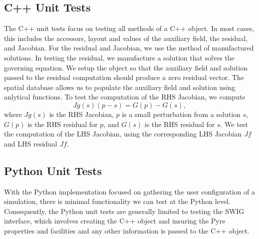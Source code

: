 
\subsection{C++ Unit Tests}

The C++ unit tests focus on testing all methods of a C++ object. In most cases, this includes the accessors, layout and
values of the auxiliary field, the residual, and Jacobian. For the residual and Jacobian, we use the method of
manufactured solutions. In testing the residual, we manufacture a solution that solves the governing equation. We setup
the object so that the auxiliary field and solution passed to the residual computation should produce a zero residual
vector. The  spatial database allows us to populate the auxiliary field and solution using
anlytical functions. To test the computation of the RHS Jacobian, we compute
\begin{equation}
    Jg(s) (p - s) = G(p) - G(s),
\end{equation}
where $Jg(s)$ is the RHS Jacobian, $p$ is a small perturbation from a solution $s$, $G(p)$ is the RHS residual for $p$,
and $G(s)$ is the RHS residual for $s$. We test the computation of the LHS Jacobian, using the corresponding LHS Jacobian $Jf$
and LHS residual $Jf$.




\subsection{Python Unit Tests}

With the Python implementation focused on gathering the user configuration of a simulation, there is
minimal functionality we can test at the Python level. Consequently, the Python unit tests are generally
limited to testing the SWIG interface, which involves creating the C++ object and insuring the Pyre
properties and facilities and any other information is passed to the C++ object.


